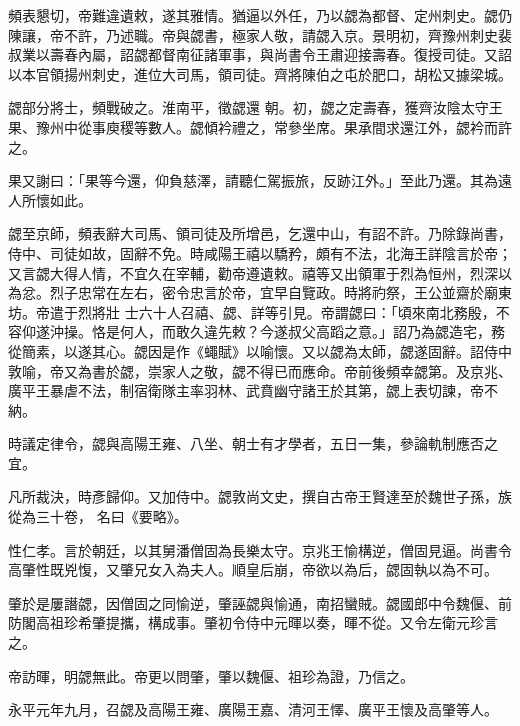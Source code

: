 \begin{pinyinscope}
 頻表懇切，帝難違遺敕，遂其雅情。猶逼以外任，乃以勰為都督、定州刺史。勰仍陳讓，帝不許，乃述職。帝與勰書，極家人敬，請勰入京。景明初，齊豫州刺史裴叔業以壽春內屬，詔勰都督南征諸軍事，與尚書令王肅迎接壽春。復授司徒。又詔以本官領揚州刺史，進位大司馬，領司徒。齊將陳伯之屯於肥口，胡松又據梁城。



 勰部分將士，頻戰破之。淮南平，徵勰還
 朝。初，勰之定壽春，獲齊汝陰太守王果、豫州中從事庾稷等數人。勰傾衿禮之，常參坐席。果承間求還江外，勰衿而許之。



 果又謝曰：「果等今還，仰負慈澤，請聽仁駕振旅，反跡江外。」至此乃還。其為遠人所懷如此。



 勰至京師，頻表辭大司馬、領司徒及所增邑，乞還中山，有詔不許。乃除錄尚書，侍中、司徒如故，固辭不免。時咸陽王禧以驕矜，頗有不法，北海王詳陰言於帝；又言勰大得人情，不宜久在宰輔，勸帝遵遺敕。禧等又出領軍于烈為恒州，烈深以為忿。烈子忠常在左右，密令忠言於帝，宜早自覽政。時將礿祭，王公並齋於廟東坊。帝遣于烈將壯
 士六十人召禧、勰、詳等引見。帝謂勰曰：「頃來南北務殷，不容仰遂沖操。恪是何人，而敢久違先敕？今遂叔父高蹈之意。」詔乃為勰造宅，務從簡素，以遂其心。勰因是作《蠅賦》以喻懷。又以勰為太師，勰遂固辭。詔侍中敦喻，帝又為書於勰，崇家人之敬，勰不得已而應命。帝前後頻幸勰第。及京兆、廣平王暴虐不法，制宿衛隊主率羽林、武賁幽守諸王於其第，勰上表切諫，帝不納。



 時議定律令，勰與高陽王雍、八坐、朝士有才學者，五日一集，參論軌制應否之宜。



 凡所裁決，時彥歸仰。又加侍中。勰敦尚文史，撰自古帝王賢達至於魏世子孫，族從為三十卷，
 名曰《要略》。



 性仁孝。言於朝廷，以其舅潘僧固為長樂太守。京兆王愉構逆，僧固見逼。尚書令高肇性既兇愎，又肇兄女入為夫人。順皇后崩，帝欲以為后，勰固執以為不可。



 肇於是屢譖勰，因僧固之同愉逆，肇誣勰與愉通，南招蠻賊。勰國郎中令魏偃、前防閣高祖珍希肇提攜，構成事。肇初令侍中元暉以奏，暉不從。又令左衛元珍言之。



 帝訪暉，明勰無此。帝更以問肇，肇以魏偃、祖珍為證，乃信之。



 永平元年九月，召勰及高陽王雍、廣陽王嘉、清河王懌、廣平王懷及高肇等人。




\end{pinyinscope}
